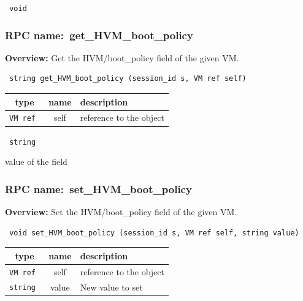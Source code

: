\vspace{0.3cm}

{\tt 
void
}



\vspace{0.3cm}
\vspace{0.3cm}
\vspace{0.3cm}
\subsubsection{RPC name:~get\_HVM\_boot\_policy}

{\bf Overview:} 
Get the HVM/boot\_policy field of the given VM.

\begin{verbatim} string get_HVM_boot_policy (session_id s, VM ref self)\end{verbatim}



 
\vspace{0.3cm}
\begin{tabular}{|c|c|p{7cm}|}
 \hline
{\bf type} & {\bf name} & {\bf description} \\ \hline
{\tt VM ref } & self & reference to the object \\ \hline 

\end{tabular}

\vspace{0.3cm}

{\tt 
string
}


value of the field
\vspace{0.3cm}
\vspace{0.3cm}
\vspace{0.3cm}
\subsubsection{RPC name:~set\_HVM\_boot\_policy}

{\bf Overview:} 
Set the HVM/boot\_policy field of the given VM.

\begin{verbatim} void set_HVM_boot_policy (session_id s, VM ref self, string value)\end{verbatim}



 
\vspace{0.3cm}
\begin{tabular}{|c|c|p{7cm}|}
 \hline
{\bf type} & {\bf name} & {\bf description} \\ \hline
{\tt VM ref } & self & reference to the object \\ \hline 

{\tt string } & value & New value to set \\ \hline 

\end{tabular}

